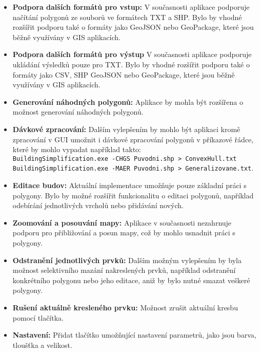 \begin{itemize} 
    \item \textbf{Podpora dalších formátů pro vstup:} V současnosti aplikace podporuje načítání polygonů ze souborů ve formátech TXT a SHP. Bylo by vhodné rozšířit podporu také o formáty jako GeoJSON nebo GeoPackage, které jsou běžně využívány v GIS aplikacích.

    \item \textbf{Podpora dalších formátů pro výstup} V současnosti aplikace podporuje ukládání výsledků pouze pro TXT. Bylo by vhodné rozšířit podporu také o formáty jako CSV, SHP GeoJSON nebo GeoPackage, které jsou běžně využívány v GIS aplikacích.

    \item \textbf{Generování náhodných polygonů:} Aplikace by mohla být rozšířena o možnost generování náhodných polygonů.
    
    \item \textbf{Dávkové zpracování:} Dalším vylepšením by mohlo být aplikaci kromě zpracování v GUI umožnit i dávkové zpracování polygonů v příkazové řádce, které by mohlo vypadat například takto:\\ \texttt{BuildingSimplification.exe -CHGS Puvodni.shp > ConvexHull.txt}\\ \texttt{BuildingSimplification.exe -MAER Puvodni.shp > Generalizovane.txt}.
    
    \item \textbf{Editace budov:} Aktuální implementace umožňuje pouze základní práci s polygony. Bylo by možné rozšířit funkcionalitu o editaci polygonů, například odebírání jednotlivých vrcholů nebo přidávání nových.
    
    \item \textbf{Zoomování a posouvání mapy:} Aplikace v současnosti nezahrnuje podporu pro přibližování a posun mapy, což by mohlo usnadnit práci s polygony.
    
    \item \textbf{Odstranění jednotlivých prvků:} Dalším možným vylepšením by byla možnost selektivního mazání nakreslených prvků, například odstranění konkrétního polygonu nebo jeho editace, aniž by bylo nutné smazat veškeré polygony.

    \item \textbf{Rušení aktuálně kresleného prvku:} Možnost zrušit aktuální kresbu pomocí tlačítka.

    \item \textbf{Nastavení:} Přidat tlačítko umožňující nastavení parametrů, jako jsou barva, tloušťka a velikost.


\end{itemize}
